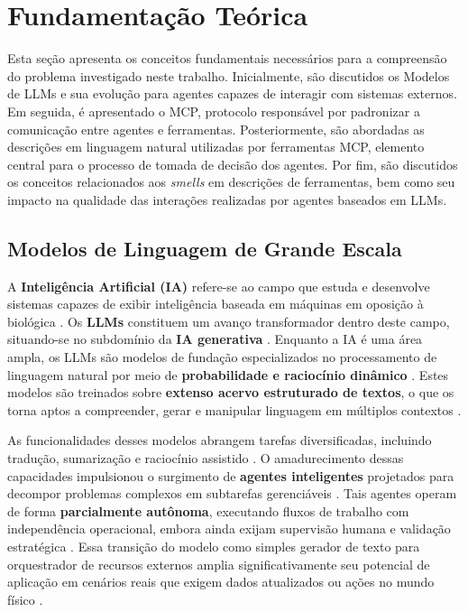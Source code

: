 \section{Fundamentação Teórica}
\label{sec:fundamentacao}
Esta seção apresenta os conceitos fundamentais necessários para a compreensão do problema investigado neste trabalho. Inicialmente, são discutidos os Modelos de LLMs e sua evolução para agentes capazes de interagir com sistemas externos. Em seguida, é apresentado o MCP, protocolo responsável por padronizar a comunicação entre agentes e ferramentas. Posteriormente, são abordadas as descrições em linguagem natural utilizadas por ferramentas MCP, elemento central para o processo de tomada de decisão dos agentes. Por fim, são discutidos os conceitos relacionados aos \textit{smells} em descrições de ferramentas, bem como seu impacto na qualidade das interações realizadas por agentes baseados em LLMs.

\subsection{Modelos de Linguagem de Grande Escala}

A \textbf{Inteligência Artificial (IA)} refere-se ao campo que estuda e desenvolve sistemas capazes de exibir inteligência baseada em máquinas em oposição à biológica \cite{Taraghi2026}. Os \textbf{LLMs} constituem um avanço transformador dentro deste campo, situando-se no subdomínio da \textbf{IA generativa} \cite{mcpAtFirstGlance, multiagent}. Enquanto a IA é uma área ampla, os LLMs são modelos de fundação especializados no processamento de linguagem natural por meio de \textbf{probabilidade e raciocínio dinâmico} \cite{2025arXiv250814704L}. Estes modelos são treinados sobre \textbf{extenso acervo estruturado de textos}, o que os torna aptos a compreender, gerar e manipular linguagem em múltiplos contextos \cite{mcpAtFirstGlance, NEURIPS2023_91f18a12}.

As funcionalidades desses modelos abrangem tarefas diversificadas, incluindo tradução, sumarização e raciocínio assistido \cite{2025arXiv250814704L, 11298840}. O amadurecimento dessas capacidades impulsionou o surgimento de \textbf{agentes inteligentes} projetados para decompor problemas complexos em subtarefas gerenciáveis \cite{2025arXiv250814704L}. Tais agentes operam de forma \textbf{parcialmente autônoma}, executando fluxos de trabalho com independência operacional, embora ainda exijam supervisão humana e validação estratégica \cite{multiagent}. Essa transição do modelo como simples gerador de texto para orquestrador de recursos externos amplia significativamente seu potencial de aplicação em cenários reais que exigem dados atualizados ou ações no mundo físico \cite{2025arXiv250814704L}.



